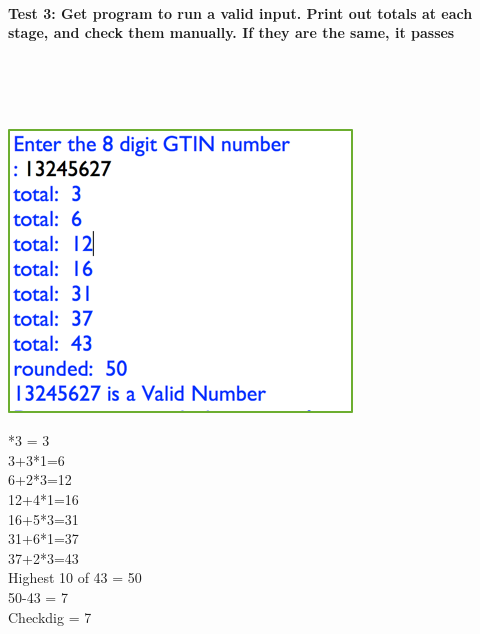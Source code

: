 \documentclass[a4paper]{article}
\begin{document}
\paragraph{Test 3: Get program to run a valid input. Print out totals at each stage, and check them manually. If they are the same, it passes}~\par ~\par 
\noindent\includegraphics{testing_4.png} \par 
{}*3 = 3 \\
3+3*1=6 \\
6+2*3=12 \\ 
12+4*1=16 \\
16+5*3=31 \\
31+6*1=37 \\
37+2*3=43 \\
Highest 10 of 43 = 50 \\
50-43 = 7 \\ 
Checkdig = 7 \\
\end{document}

